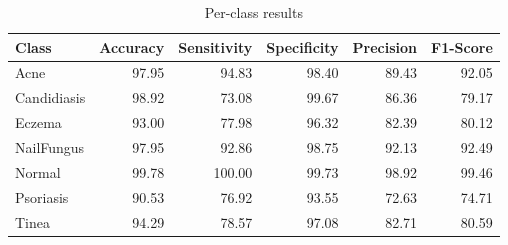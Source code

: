 \begin{table}
\caption{Per-class results}
\label{tab:results}
\begin{tabular}{lrrrrr}
\toprule
Class & Accuracy & Sensitivity & Specificity & Precision & F1-Score \\
\midrule
Acne & 97.95 & 94.83 & 98.40 & 89.43 & 92.05 \\
Candidiasis & 98.92 & 73.08 & 99.67 & 86.36 & 79.17 \\
Eczema & 93.00 & 77.98 & 96.32 & 82.39 & 80.12 \\
NailFungus & 97.95 & 92.86 & 98.75 & 92.13 & 92.49 \\
Normal & 99.78 & 100.00 & 99.73 & 98.92 & 99.46 \\
Psoriasis & 90.53 & 76.92 & 93.55 & 72.63 & 74.71 \\
Tinea & 94.29 & 78.57 & 97.08 & 82.71 & 80.59 \\
\bottomrule
\end{tabular}
\end{table}
